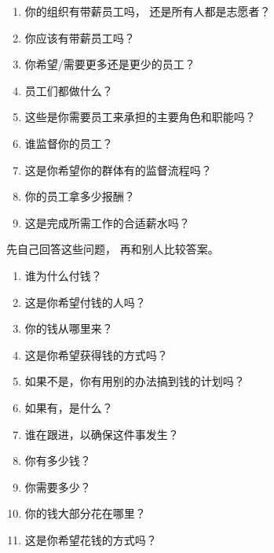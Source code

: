 \begin{enumerate}

\item
  你的组织有带薪员工吗，
  还是所有人都是志愿者？

\item
  你应该有带薪员工吗？

\item
  你希望/需要更多还是更少的员工？

\item
  员工们都做什么？

\item
  这些是你需要员工来承担的主要角色和职能吗？

\item
  谁监督你的员工？

\item
  这是你希望你的群体有的监督流程吗？

\item
  你的员工拿多少报酬？

\item
  这是完成所需工作的合适薪水吗？

\end{enumerate}


先自己回答这些问题，
再和别人比较答案。

\begin{enumerate}

\item
  谁为什么付钱？

\item
  这是你希望付钱的人吗？

\item
  你的钱从哪里来？

\item
  这是你希望获得钱的方式吗？

\item
  如果不是，你有用别的办法搞到钱的计划吗？

\item
  如果有，是什么？

\item
  谁在跟进，以确保这件事发生？

\item
  你有多少钱？

\item
  你需要多少？

\item
  你的钱大部分花在哪里？

\item
  这是你希望花钱的方式吗？

\end{enumerate}

